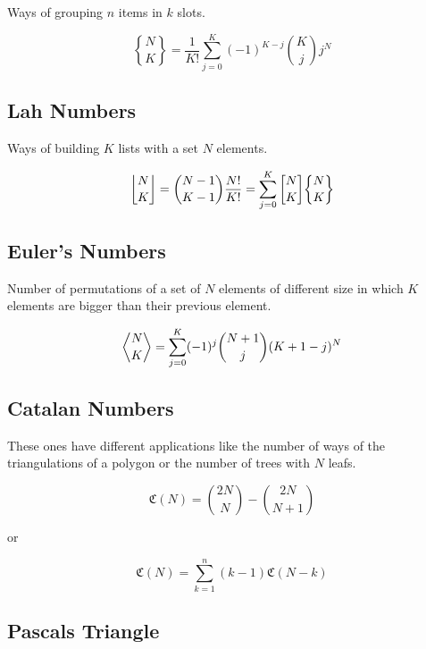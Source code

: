 Ways of grouping \(n\) items in \(k\) slots.

\[
\genfrac{\{}{\}}{0pt}{}{N}{K} = \frac{1}{K!} \sum_{j=0}^{K} (-1)^{K - j} \binom{K}{j} j^N
\]

\subsection{Lah Numbers}

Ways of building \(K\) lists with a set \(N\) elements.

\[
\genfrac{\lfloor}{\rfloor}{0pt}{}{N}{K} = \binom{N - 1}{K - 1} \frac{N!}{K!} = \sum_{j=0}^{K} \genfrac{[}{]}{0pt}{}{N}{K} \genfrac{\{}{\}}{0pt}{}{N}{K}
\]

\subsection{Euler's Numbers}

Number of permutations of a set of \(N\) elements of different size in which
\(K\) elements are bigger than their previous element.

\[
\genfrac{\langle}{\rangle}{0pt}{}{N}{K} = \sum_{j = 0}^{K} (-1)^j \binom{N + 1}{j} (K + 1 - j)^N
\]

\subsection{Catalan Numbers}

These ones have different applications like the number of ways of the triangulations of
a polygon or the number of trees with \(N\) leafs.

\[\mathfrak{C}(N) = \binom{2N}{N} - \binom{2N}{N + 1}\]

or

\[\mathfrak{C}(N) = \sum_{k=1}^{n}(k - 1) \mathfrak{C}(N - k)\]

\subsection{Pascals Triangle}

